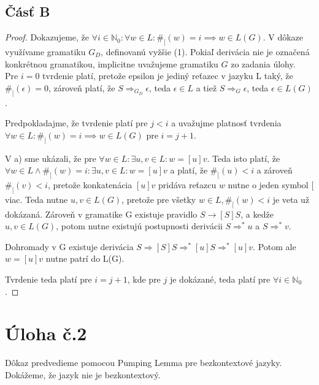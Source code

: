 \documentclass[10pt]{article}
\begin{document}
\subsection*{Čásť B}
\begin{proof}
    Dokazujeme, že $\forall i \in \mathbb{N}_0: \forall w \in L: \#_[(w) = i \implies w \in L(G)$. V
    dôkaze
    využívame gramatiku $G_D$, definovanú vyžšie (1). Pokiaľ derivácia nie je označená konkrétnou
    gramatikou, implicitne uvažujeme gramatiku $G$ zo zadania úlohy.\\

    Pre $i = 0$ tvrdenie platí, pretože epsilon je jediný reťazec v jazyku L taký, že $\#_[(\epsilon)
    = 0$, zároveň platí, že $S \Rightarrow_{G_D} \epsilon$, teda $\epsilon \in L$ a tiež $S
    \Rightarrow_{G} \epsilon$, teda $\epsilon \in L(G)$. 

    Predpokladajme, že tvrdenie platí pre $j <  i$ a uvažujme platnosť tvrdenia $\forall w \in L: \#_[(w) = i \implies w \in L(G)$
    pre $i = j+1$.
    
    V a) sme ukázali, že pre $\forall w \in L: \exists u,v \in L: w = [u]v$. Teda isto platí, že
    $\forall w \in L \land \#_[(w) = i: \exists u,v \in L: w = [u]v$ a platí, že $\#_[(u) < i$ a zároveň
    $\#_[(v) < i$, pretože konkatenácia $[u]v$ pridáva reťazcu $w$ nutne o jeden symbol $[$ viac.
    Teda nutne $u,v \in L(G)$, pretože pre všetky $w\in L, \#_[(w) < i$ je veta už dokázaná. 
    Zároveň v gramatike G existuje pravidlo $S\to [S]S$, a kedže $u,v \in L(G)$, potom nutne existujú
    postupnosti derivácii $S\Rightarrow^* u$ a $S\Rightarrow^* v$.

    Dohromady v G existuje derivácia $S\Rightarrow [S]S \Rightarrow^* [u]S \Rightarrow^* [u]v$. Potom ale $w = [u]v$
    nutne patrí do L(G).

    Tvrdenie teda platí pre $i = j + 1$, kde pre $j$ je dokázané, teda platí pre $\forall i \in
    \mathbb{N}_0$. 
\end{proof}


\section*{Úloha č.2}
Dôkaz predvedieme pomocou Pumping Lemma pre bezkontextové jazyky. Dokážeme, že jazyk nie je
bezkontextový.
\end{document}
